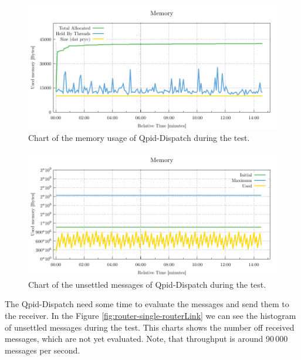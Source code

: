 \begin{figure}[H]
	\centering
	\includegraphics[width=1\linewidth]{obrazky-figures/charts/singlepoint-router-throughput-memory.pdf}
	\caption{Chart of the memory usage of Qpid-Dispatch during the test.}
	\label{fig:router-single-memory}
\end{figure}

\begin{figure}[H]
	\centering
	\includegraphics[width=1\linewidth]{obrazky-figures/charts/singlepoint-broker-throughput-memory.pdf}
	\caption{Chart of the unsettled messages of Qpid-Dispatch during the test.}
	\label{fig:broker-single-memory}
\end{figure}

The Qpid-Dispatch need some time to evaluate the messages and send them to the receiver. In the Figure \ref{fig:router-single-routerLink} we can see the histogram of unsettled messages during the test. This charts shows the number off received messages, which are not yet evaluated. Note, that throughput is around 90\,000 messages per second.

